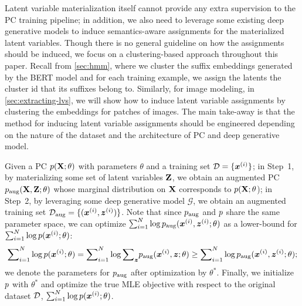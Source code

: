 \documentclass{article} %
\newcommand{\anji}[1]{\textcolor{purple}{\textbf{[Anji: #1]}}}
\begin{document}
Latent variable materialization itself cannot provide any extra supervision to the PC training pipeline; in addition, we also need to leverage some existing deep generative models to induce semantics-aware assignments for the materialized latent variables. Though there is no general guideline on how the assignments should be induced, we focus on a clustering-based approach throughout this paper. Recall from \cref{sec:hmm}, where we cluster the suffix embeddings generated by the BERT model and for each training example, we assign the latents the cluster id that its suffixes belong to. Similarly, for image modeling, in \cref{sec:extracting-lvs}, we will show how to induce latent variable assignments by clustering the embeddings for patches of images. The main take-away is that the method for inducing latent variable assignments should be engineered depending on the nature of the dataset and the architecture of PC and deep generative model.


Given a PC ${p}(\mathbf{X}; \theta)$ with parameters $\theta$ and a training set $\mathcal{D} = \{\boldsymbol{x}^{(i)}\}$; in Step~1, by materializing some set of latent variables $\mathbf{Z}$, we obtain an augmented PC ${p}_{\text{aug}}(\mathbf{X}, \mathbf{Z}; \theta)$ whose marginal distribution on $\mathbf{X}$ corresponds to ${p}(\mathbf{X}; \theta$); in Step~2, by leveraging some deep generative model $\mathcal{G}$, we obtain an augmented training set $\mathcal{D}_{\text{aug}} = \{(\boldsymbol{x}^{(i)}, \boldsymbol{z}^{(i)})\}$. Note that since ${p}_{\text{aug}}$ and ${p}$ share the same parameter space, we can optimize ${\sum}_{i=1}^{N} \log{p}_{\text{aug}}(\boldsymbol{x}^{(i)}, \boldsymbol{z}^{(i)}; \theta)$ as a lower-bound for ${\sum}_{i=1}^{N} \log {p}(\boldsymbol{x}^{(i)}; \theta)$:
\begin{align*}
        {\sum}_{i=1}^{N} \log {p}(\boldsymbol{x}^{(i)}; \theta) = 
        {\sum}_{i=1}^{N}\log{\sum}_{\boldsymbol{z}} {p}_{\text{aug}}(\boldsymbol{x}^{(i)}, \boldsymbol{z}; \theta) \geq
        {\sum}_{i=1}^{N} \log{p}_{\text{aug}}(\boldsymbol{x}^{(i)}, \boldsymbol{z}^{(i)}; \theta);
\end{align*}
we denote the parameters for ${p}_{\text{aug}}$ after optimization by $\theta^{*}$. Finally, we initialize ${p}$ with $\theta^{*}$ and optimize the true MLE objective with respect to the original dataset $\mathcal{D}$, ${\sum}_{i=1}^{N} \log {p}(\boldsymbol{x}^{(i)}; \theta)$.
\end{document}
